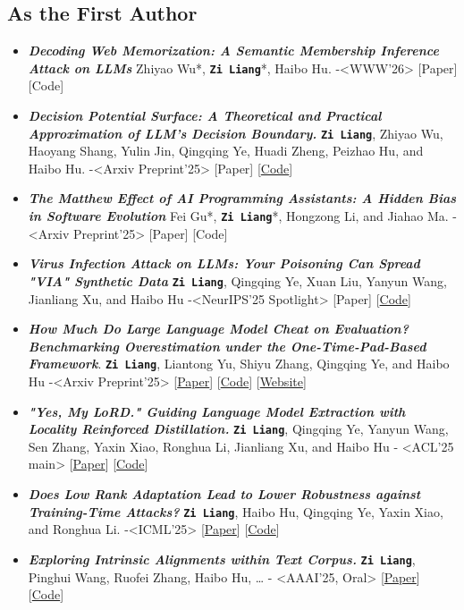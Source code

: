 \documentclass[11pt]{article}
\begin{document}
\subsection{As the First Author}
\label{sec:orgd640920}
\begin{itemize}
\item \textbf{\emph{Decoding Web Memorization: A Semantic Membership
      Inference Attack on LLMs}} Zhiyao Wu*, \textbf{\texttt{Zi Liang}}*, Haibo Hu. -<WWW'26> [Paper] [Code]
\item \textbf{\emph{Decision Potential Surface: A Theoretical and Practical Approximation of LLM's Decision Boundary.}} \textbf{\texttt{Zi Liang}}, Zhiyao Wu, Haoyang Shang, Yulin Jin, Qingqing Ye, Huadi Zheng, Peizhao Hu, and Haibo Hu. -<Arxiv Preprint'25> [Paper] [\href{https://github.com/liangzid/DPS}{Code}]
\item \emph{\textbf{The Matthew Effect of AI Programming Assistants: A Hidden Bias in Software Evolution}} Fei Gu*, \textbf{\texttt{Zi Liang}}*, Hongzong Li, and Jiahao Ma. -<Arxiv Preprint'25> [Paper] [Code]
\item \emph{\textbf{Virus Infection Attack on LLMs: Your Poisoning Can Spread "VIA" Synthetic Data}} \textbf{\texttt{Zi Liang}}, Qingqing Ye, Xuan Liu, Yanyun Wang, Jianliang Xu, and Haibo Hu -<NeurIPS'25 Spotlight> [Paper] [\href{https://github.com/liangzid/VirusInfectionAttack}{Code}]
\item \emph{\textbf{How Much Do Large Language Model Cheat on Evaluation? Benchmarking Overestimation under the One-Time-Pad-Based Framework}}. \textbf{\texttt{Zi Liang}}, Liantong Yu, Shiyu Zhang, Qingqing Ye, and Haibo Hu -<Arxiv Preprint'25> [\href{https://arxiv.org/abs/2507.19219}{Paper}] [\href{https://github.com/liangzid/ArxivRoll/}{Code}] [\href{https://arxivroll.moreoverai.com/}{Website}]
\item \emph{\textbf{"Yes, My LoRD." Guiding Language Model Extraction with Locality Reinforced Distillation.}} \textbf{\texttt{Zi Liang}}, Qingqing Ye, Yanyun Wang, Sen Zhang, Yaxin Xiao, Ronghua Li, Jianliang Xu, and Haibo Hu - <ACL'25 main> [\href{https://arxiv.org/abs/2409.02718}{Paper}] [\href{https://github.com/liangzid/LoRD-MEA}{Code}]
\item \emph{\textbf{Does Low Rank Adaptation Lead to Lower Robustness against Training-Time Attacks?}} \textbf{\texttt{Zi Liang}}, Haibo Hu, Qingqing Ye, Yaxin Xiao, and Ronghua Li. -<ICML'25> [\href{https://arxiv.org/abs/2505.12871}{Paper}] [\href{https://github.com/liangzid/LoRA-sSecurity}{Code}]
\item \emph{\textbf{Exploring Intrinsic Alignments within Text Corpus.}} \textbf{\texttt{Zi Liang}}, Pinghui Wang, Ruofei Zhang, Haibo Hu, \ldots{} - <AAAI'25, Oral> [\href{https://ojs.aaai.org/index.php/AAAI/article/view/34957}{Paper}] [\href{https://github.com/liangzid/TEMP}{Code}]

\end{itemize}
\end{document}
